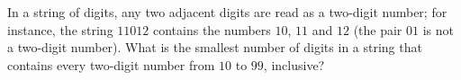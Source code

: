 In a string of digits, any two adjacent digits are read as a two-digit number; for instance, the string $11012$ contains the numbers $10$, $11$ and $12$ (the pair $01$ is not a two-digit number). What is the smallest number of digits in a string that contains every two-digit number from $10$ to $99$, inclusive?
